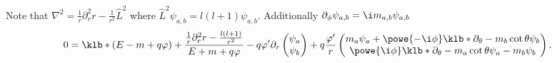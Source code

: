 \documentclass[english, parskip=full]{scrartcl}
\begin{document}
Note that $\nabla^2 = \frac{1}{r} \partial_r^2 r - \frac{1}{r^2} \hat{L}^2$ where $\hat{L}^2 \psi_{a,b} = l(l+1) \psi_{a,b}$.
Additionally $\partial_\phi \psi_{a,b} = \i m_{a,b} \psi_{a,b}$
\begin{align}
0 &= \klb*{(E-m+q\varphi) + \frac{\frac{1}{r}\partial_r^2 r - \frac{l(l+1)}{r^2}}{E+m+q\varphi} -q \varphi' \partial_r } \begin{pmatrix}
\psi_a \\ \psi_b
\end{pmatrix} + q\frac{\varphi'}{r} \begin{pmatrix}
m_a \psi_a + \powe{-\i\phi} \klb*{\partial_\theta - m_b\cot\theta}\psi_b \\ \powe{\i\phi} \klb*{\partial_\theta - m_a \cot\theta}\psi_a - m_b\psi_b
\end{pmatrix}.
\end{align}
\end{document}
